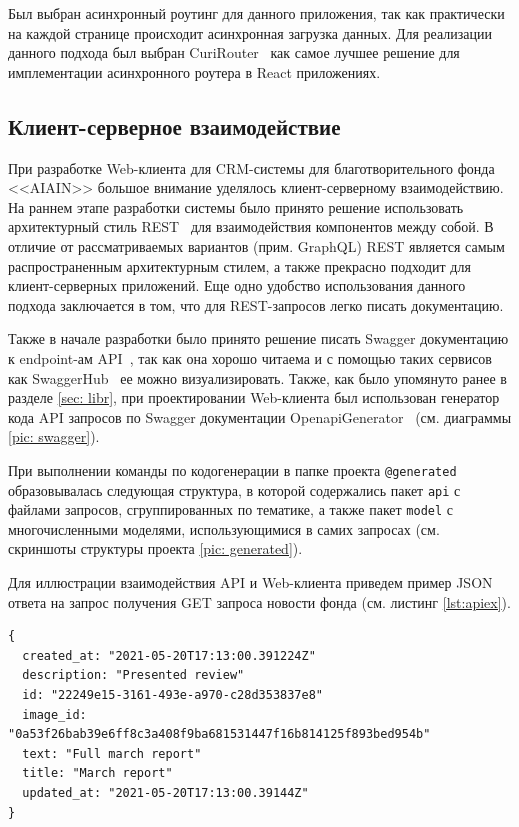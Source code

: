 \documentclass[a4paper,12pt,reqno]{article}
\begin{document}
Был выбран асинхронный роутинг для данного приложения, так как практически на каждой странице происходит асинхронная загрузка данных. Для реализации данного подхода был выбран CuriRouter~\cite{curi} как самое лучшее решение для имплементации асинхронного роутера в React приложениях.

\subsection{Клиент-серверное взаимодействие}

При разработке Web-клиента для CRM-системы для благотворительного фонда <<AIAIN>> большое внимание уделялось клиент-серверному взаимодействию. На раннем этапе разработки системы было принято решение использовать архитектурный стиль REST~\cite{rest} для взаимодействия компонентов между собой. В отличие от рассматриваемых вариантов (прим. GraphQL) REST является самым распространенным архитектурным стилем, а также прекрасно подходит для клиент-серверных приложений. Еще одно удобство использования данного подхода заключается в том, что для REST-запросов легко писать документацию. 

Также в начале разработки было принято решение писать Swagger документацию к endpoint-ам API~\cite{api}, так как она хорошо читаема и с помощью таких сервисов как SwaggerHub~\cite{swaggerhub} ее можно визуализировать. Также, как было упомянуто ранее в разделе \ref{sec: libr}, при проектировании Web-клиента был использован генератор кода API запросов по Swagger документации OpenapiGenerator~\cite{openapi} (см. диаграммы \ref{pic: swagger}). 

При выполнении команды по кодогенерации в папке проекта \texttt{@generated} образовывалась следующая структура, в которой содержались пакет \texttt{api} с файлами запросов, сгруппированных по тематике, а также пакет \texttt{model} с многочисленными моделями, использующимися в самих запросах (см. скриншоты структуры проекта \ref{pic: generated}).  

Для иллюстрации взаимодействия API и Web-клиента приведем пример JSON ответа на запрос получения GET запроса новости фонда (см. листинг \ref{lst:apiex}).
\begin{lstlisting}[frame=single, basicstyle=\footnotesize\ttfamily, label={lst:apiex}, caption={Пример JSON body ответа на запрос GET /api/news/:id},captionpos=b]
{
  created_at: "2021-05-20T17:13:00.391224Z"
  description: "Presented review"
  id: "22249e15-3161-493e-a970-c28d353837e8"
  image_id: "0a53f26bab39e6ff8c3a408f9ba681531447f16b814125f893bed954b"
  text: "Full march report"
  title: "March report"
  updated_at: "2021-05-20T17:13:00.39144Z"
}
\end{lstlisting}
\end{document}
